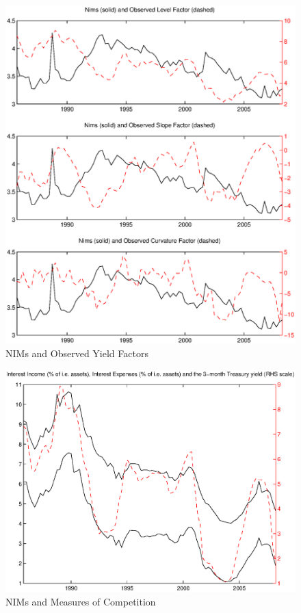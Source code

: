 \documentclass[11pt]{article}
\begin{document}
\begin{frame}
\newpage \clearpage
\begin{figure}
\caption{NIMs and Observed Yield Factors} \label{figure_nims_factors}
\center
\includegraphics[scale=0.85]{figure_nims_factors.ps}
\end{figure}

\newpage \clearpage
\begin{figure}
\caption{NIMs and Measures of Competition} \label{figure_nims_competition}
\center
\includegraphics[scale=0.85]{figure_nims_competition.ps}
\end{figure}


\end{frame}
\end{document}
